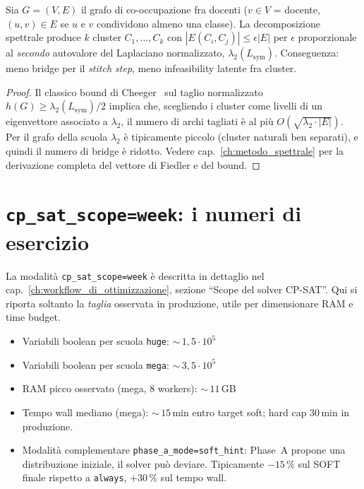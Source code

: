\begin{proposizione}
Sia $G = (V, E)$ il grafo di co-occupazione fra docenti
($v \in V$ = docente, $(u,v) \in E$ se $u$ e $v$ condividono
almeno una classe). La decomposizione spettrale produce $k$
cluster $C_1, \dots, C_k$ con $|E(C_i, C_j)| \le \epsilon |E|$
per $\epsilon$ proporzionale al \emph{secondo} autovalore del
Laplaciano normalizzato, $\lambda_2(L_{\mathrm{sym}})$.
Conseguenza: meno bridge per il \emph{stitch step}, meno
infeasibility latente fra cluster.
\end{proposizione}

\begin{proof}
Il classico bound di Cheeger~\parencite{chung1997} sul taglio normalizzato
$h(G) \ge \lambda_2(L_{\mathrm{sym}})/2$ implica che, scegliendo
i cluster come livelli di un eigenvettore associato a
$\lambda_2$, il numero di archi tagliati \`e al pi\`u
$O(\sqrt{\lambda_2 \cdot |E|})$. Per il grafo della scuola
$\lambda_2$ \`e tipicamente piccolo (cluster naturali
ben separati), e quindi il numero di bridge \`e ridotto. Vedere
cap.~\ref{ch:metodo_spettrale} per la derivazione completa del
vettore di Fiedler e del bound.
\end{proof}



\section{\texttt{cp\_sat\_scope=week}: i numeri di esercizio}
\label{sec:scope-week-numbers}

La modalit\`a \texttt{cp\_sat\_scope=week} \`e descritta in
dettaglio nel cap.~\ref{ch:workflow_di_ottimizzazione}, sezione
``Scope del solver CP-SAT''. Qui si riporta soltanto la
\emph{taglia} osservata in produzione, utile per dimensionare
RAM e time budget.

\begin{statsbox}
\begin{itemize}
\item Variabili boolean per scuola \texttt{huge}: $\sim$\,$1{,}5 \cdot 10^5$
\item Variabili boolean per scuola \texttt{mega}: $\sim$\,$3{,}5 \cdot 10^5$
\item RAM picco osservato (mega, 8 workers): $\sim$\,$11$\,GB
\item Tempo wall mediano (mega): $\sim$\,$15$\,min entro target soft;
      hard cap $30$\,min in produzione.
\item Modalit\`a complementare \texttt{phase\_a\_mode=soft\_hint}:
      Phase~A propone una distribuzione iniziale, il solver pu\`o
      deviare. Tipicamente $-15\,\%$ sul SOFT finale rispetto a
      \texttt{always}, $+30\,\%$ sul tempo wall.
\end{itemize}
\end{statsbox}

